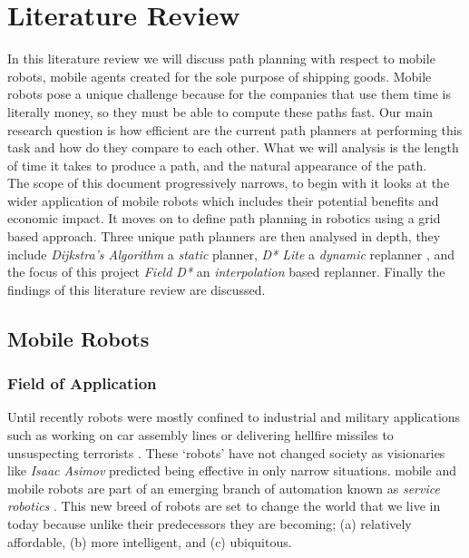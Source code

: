 \chapter{Literature Review}


\noindent
In this literature review we will discuss path planning with respect to mobile robots, mobile agents created for the sole purpose of shipping goods. Mobile robots pose a unique challenge because for the companies that use them time is literally money, so they must be able to compute these paths fast. Our main research question is how efficient are the current path planners at performing this task and how do they compare to each other. What we will analysis is the length of time it takes to produce a path, and the natural appearance of the path.\\

\noindent
The scope of this document progressively narrows, to begin with it looks at the wider application of mobile robots which includes their potential benefits and economic impact. It moves on to define path planning in robotics using a grid based approach. Three unique path planners are then analysed in depth, they include \textit{Dijkstra's Algorithm} \cite{DIJKSTRA} a \textit{static} planner, \textit{D* Lite} a \textit{dynamic} replanner \cite{D*LITE}, and the focus of this project \textit{Field D*} an \textit{interpolation} based replanner. Finally the findings of this literature review are discussed.

\newpage


\section{Mobile Robots}

\subsection{Field of Application}
\noindent
Until recently robots were mostly confined to industrial and military applications such as working on car assembly lines or delivering hellfire missiles to unsuspecting terrorists \cite{DRONE}. These `robots' have not changed society as visionaries like \textit{Isaac Asimov} predicted being effective in only narrow situations. mobile and mobile robots are part of an emerging branch of automation known as \textit{service robotics} \cite{SERVICE}. This new breed of robots are set to change the world that we live in today because unlike their predecessors they are becoming; (a) relatively affordable, (b) more intelligent, and (c) ubiquitous.\\

